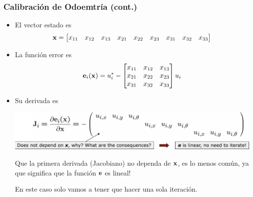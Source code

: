 \begin{frame}
    \frametitle{Calibración de Odoemtría (cont.)}
    \begin{itemize}

        \item El vector estado es 
        \begin{equation*}
            \boldsymbol{\mathbf{x}} =
            \begin{bmatrix}
                x_{11} & x_{12} & x_{13} & x_{21} & x_{22} & x_{23} & x_{31} & x_{32} & x_{33}
            \end{bmatrix}
        \end{equation*}
        \item La función error es
        \begin{equation*}
            \boldsymbol{\mathbf{e}}_{i}(\boldsymbol{\mathbf{x}}) = u_{i}^{*} - 
            \begin{bmatrix}
                x_{11} & x_{12} & x_{13} \\
                x_{21} & x_{22} & x_{23} \\
                x_{31} & x_{32} & x_{33}
            \end{bmatrix}
            u_{i}
        \end{equation*}
        \item Su derivada es
        
    
        \begin{center}
            \includegraphics[width=0.8\columnwidth]{images/odometry_calibration_jacobian.pdf}
        \end{center}
        
        Que la primera derivada (Jacobiano) no dependa de $\boldsymbol{\mathbf{x}}$, es lo menos común, ya que significa que la función $\boldsymbol{\mathbf{e}}$ es lineal!
        
        En este caso solo vamos a tener que hacer una sola iteración.

    \end{itemize}

    
\end{frame}

